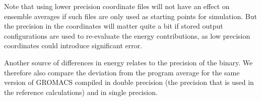 
Note that using lower precision coordinate files will not have an
effect on ensemble averages if such files are only used as starting
points for simulation. But the precision in the coordinates will
matter quite a bit if stored output configurations are used to
re-evaluate the energy contributions, as low precision coordinates could introduce
significant error.


Another source of differences in energy relates to the precision of
the binary.  We therefore also compare the deviation from the
program average for the same version of GROMACS compiled in double
precision (the precision that is used in the reference calculations)
and in single precision.


